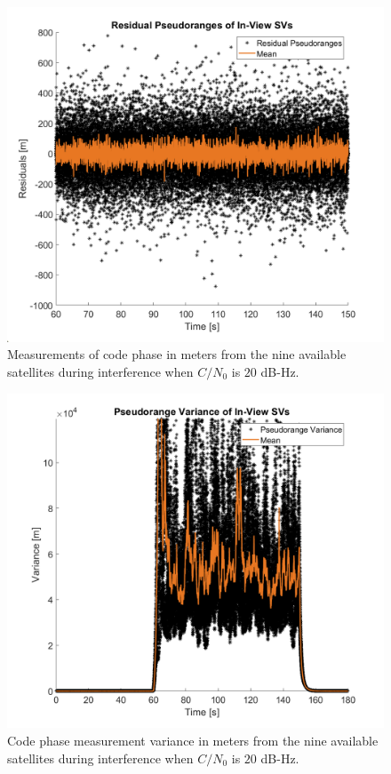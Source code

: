 \begin{figure}[!ht]
    \centering
    \includegraphics[width=0.75\linewidth]{Figures/Results/Scenario1/Case20/codephase.png}
    \caption{Measurements of code phase in meters from the nine available satellites during interference when \(C/N_0\) is \(20\) dB-Hz.}\label{fig:codephase20}
\end{figure}

\begin{figure}[!ht]
    \centering
    \includegraphics[width=0.75\linewidth]{Figures/Results/Scenario1/Case20/codeVariance.png}
    \caption{Code phase measurement variance in meters from the nine available satellites during interference when \(C/N_0\) is \(20\) dB-Hz.}\label{fig:codephaseVariance20}
\end{figure}


